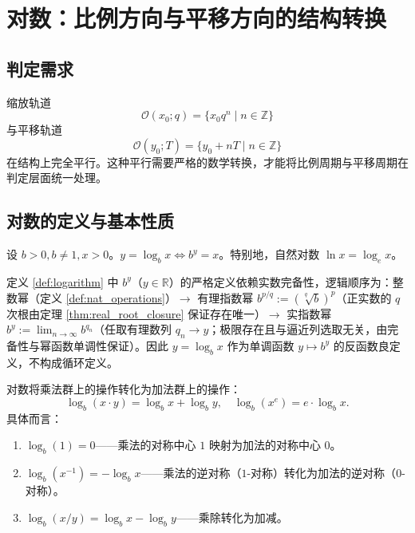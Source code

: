 \section{\texorpdfstring{对数：比例方向与平移方向的结构转换}{对数：比例方向与平移方向的结构转换}}

\subsection{\texorpdfstring{判定需求}{判定需求}}

缩放轨道
\[
\mathcal{O}(x_0; q) = \{x_0 q^n \mid n\in\mathbb{Z}\}
\]
与平移轨道
\[
\mathcal{O}(y_0; T) = \{y_0 + nT \mid n\in\mathbb{Z}\}
\]
在结构上完全平行。这种平行需要严格的数学转换，才能将比例周期与平移周期在判定层面统一处理。

\subsection{\texorpdfstring{对数的定义与基本性质}{对数的定义与基本性质}}

\begin{definition}[对数的定义]\label{def:logarithm}
设 $b > 0, b \neq 1, x > 0$。$y = \log_b x \iff b^y = x$。特别地，自然对数 $\ln x = \log_e x$。
\end{definition}

\begin{remark}[实指数幂的定义顺序]
定义 \ref{def:logarithm} 中 $b^y$（$y \in \mathbb{R}$）的严格定义依赖实数完备性，逻辑顺序为：整数幂（定义 \ref{def:nat_operations}）$\to$ 有理指数幂 $b^{p/q} := (\sqrt[q]{b})^p$（正实数的 $q$ 次根由定理 \ref{thm:real_root_closure} 保证存在唯一）$\to$ 实指数幂 $b^y := \lim_{n\to\infty} b^{q_n}$（任取有理数列 $q_n \to y$；极限存在且与逼近列选取无关，由完备性与幂函数单调性保证）。因此 $y = \log_b x$ 作为单调函数 $y \mapsto b^y$ 的反函数良定义，不构成循环定义。
\end{remark}

\begin{theorem}[对数：比例方向与平移方向的结构转换]\label{thm:logarithm_conversion}
对数将乘法群上的操作转化为加法群上的操作：
\[
\log_b(x \cdot y) = \log_b x + \log_b y, \quad \log_b(x^e) = e \cdot \log_b x.
\]
具体而言：
\begin{enumerate}[label=(\roman*)]
    \item $\log_b(1) = 0$——乘法的对称中心 $1$ 映射为加法的对称中心 $0$。
    \item $\log_b(x^{-1}) = -\log_b x$——乘法的逆对称（$1$-对称）转化为加法的逆对称（$0$-对称）。
    \item $\log_b(x / y) = \log_b x - \log_b y$——乘除转化为加减。
\end{enumerate}
\end{theorem}

